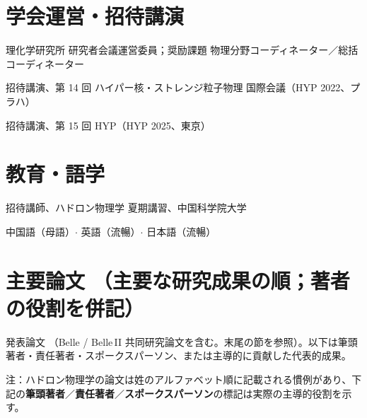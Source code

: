 \documentclass[a4paper,11pt,fontset=none]{ctexart}
\newcommand{\cvrow}[2]{%
  \noindent\makebox[2.7cm][l]{\textcolor{impblue}{\small\bfseries #1}}%
  \parbox[t]{\dimexpr\linewidth-2.8cm\relax}{#2}\par\vspace{3pt}}
\begin{document}
\begin{minipage}[t]{0.54\linewidth}
\section{学会運営・招待講演}
\cvrow{2019--2021}{理化学研究所 研究者会議運営委員；奨励課題 物理分野コーディネーター／総括コーディネーター}
\cvrow{2022}{招待講演、第 14 回 ハイパー核・ストレンジ粒子物理 国際会議（HYP 2022、プラハ）}
\cvrow{2025}{招待講演、第 15 回 HYP（HYP 2025、東京）}
\end{minipage}\hfill
\begin{minipage}[t]{0.42\linewidth}
\section{教育・語学}
\cvrow{2018/23/24}{招待講師、ハドロン物理学 夏期講習、中国科学院大学}
\cvrow{語学}{中国語（母語）$\cdot$ 英語（流暢）$\cdot$ 日本語（流暢）}
\end{minipage}

\section{主要論文 \normalfont\small（主要な研究成果の順；著者の役割を併記）}

{\small 発表論文 （Belle / Belle\,II 共同研究論文を含む。末尾の節を参照）。以下は筆頭著者・責任著者・スポークスパーソン、または主導的に貢献した代表的成果。}

{\small\color{impgray} 注：ハドロン物理学の論文は姓のアルファベット順に記載される慣例があり、下記の\textbf{筆頭著者}／\textbf{責任著者}／\textbf{スポークスパーソン}の標記は実際の主導的役割を示す。}
\end{document}
